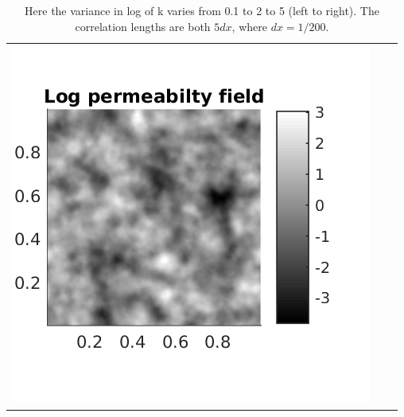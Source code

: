 \documentclass{article}
\begin{document}
\begin{table}[!h]
\begin{tabular}{c c c}
\includegraphics[scale=0.75]{figs/kfield_5_0025_0025.png}
\end{tabular}
\caption{Here the variance in log of k varies from 0.1 to 2 to 5 (left to right). The correlation lengths are both $5dx$, where $dx = 1/200$.}
\end{table}
\end{document}
